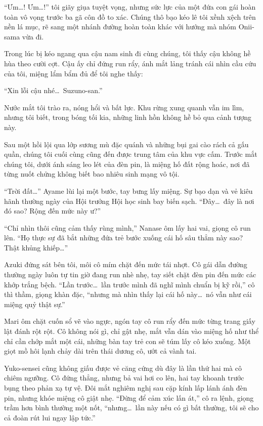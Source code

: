\documentclass[../main.tex]{subfiles}
\begin{document}
``Ưm\dots! Ưm\dots!'' tôi giãy giụa tuyệt vọng, nhưng sức lực của một đứa con gái hoàn toàn vô vọng trước ba gã côn đồ to xác. Chúng thô bạo kéo lê tôi xềnh xệch trên nền lá mục, rẽ sang một nhánh đường hoàn toàn khác với hướng mà nhóm Onii-sama vừa đi.

Trong lúc bị kéo ngang qua cậu nam sinh đi cùng chúng, tôi thấy cậu không hề hùa theo cười cợt. Cậu ấy chỉ đứng run rẩy, ánh mắt lảng tránh cái nhìn cầu cứu của tôi, miệng lẩm bẩm đủ để tôi nghe thấy:

``Xin lỗi cậu nhé\dots\ Suzuno-san.''

Nước mắt tôi trào ra, nóng hổi và bất lực. Khu rừng xung quanh vẫn im lìm, nhưng tôi biết, trong bóng tối kia, những linh hồn không hề bỏ qua cảnh tượng này.


Sau một hồi lội qua lớp sương mù đặc quánh và những bụi gai cào rách cả gấu quần, chúng tôi cuối cùng cũng đến được trung tâm của khu vực cấm. Trước mắt chúng tôi, dưới ánh sáng leo lét của đèn pin, là miệng hố đất rộng hoác, nơi đã từng nuốt chửng không biết bao nhiêu sinh mạng vô tội.

``Trời đất\dots'' Ayame lùi lại một bước, tay bưng lấy miệng. Sự bạo dạn và vẻ kiêu hãnh thường ngày của Hội trưởng Hội học sinh bay biến sạch. ``Đây\dots\ đây là nơi đó sao? Rộng đến mức này ư?''

``Chỉ nhìn thôi cũng cảm thấy rùng mình,'' Nanase ôm lấy hai vai, giọng cô run lên. ``Họ thực sự đã bắt những đứa trẻ bước xuống cái hố sâu thẳm này sao? Thật khủng khiếp\dots''

Azuki đứng sát bên tôi, môi cô mím chặt đến mức tái nhợt. Cô gái dẫn đường thường ngày luôn tự tin giờ đang run nhè nhẹ, tay siết chặt đèn pin đến mức các khớp trắng bệch. ``Lần trước\dots\ lần trước mình đã nghĩ mình chuẩn bị kỹ rồi,'' cô thì thầm, giọng khàn đặc, ``nhưng mà nhìn thấy lại cái hố này\dots\ nó vẫn như cái miệng quỷ thật sự.''

Mari ôm chặt cuốn sổ vẽ vào ngực, ngón tay cô run rẩy đến mức từng trang giấy lật đánh rột rột. Cô không nói gì, chỉ gật nhẹ, mắt vẫn dán vào miệng hố như thể chỉ cần chớp mắt một cái, những bàn tay trẻ con sẽ túm lấy cô kéo xuống. Một giọt mồ hôi lạnh chảy dài trên thái dương cô, ướt cả vành tai.

Yuko-sensei cũng không giấu được vẻ căng cứng dù đây là lần thứ hai mà cô chiêm ngưỡng. Cô đứng thẳng, nhưng bả vai hơi co lên, hai tay khoanh trước bụng theo phản xạ tự vệ. Đôi mắt nghiêm nghị sau cặp kính lấp lánh ánh đèn pin, nhưng khóe miệng cô giật nhẹ. ``Đừng để cảm xúc lấn át,'' cô ra lệnh, giọng trầm hơn bình thường một nốt, ``nhưng\dots\ lần này nếu có gì bất thường, tôi sẽ cho cả đoàn rút lui ngay lập tức.''
\end{document}
